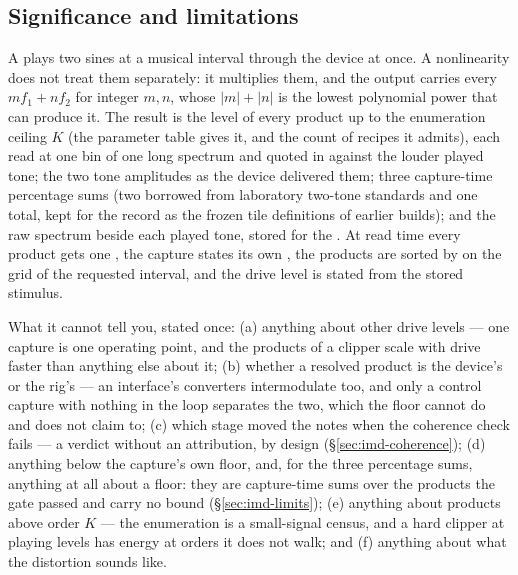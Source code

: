 \documentclass[11pt,a4paper]{article}
\begin{document}
\subsection{Significance and limitations}
A  plays two sines at a musical interval through the device
at once. A nonlinearity does not treat them separately: it multiplies them,
and the output carries every 
$m f_1 + n f_2$ for integer $m, n$, whose  $|m| + |n|$
is the lowest polynomial power that can produce it. The result is the level
of every product up to the enumeration ceiling $K$ (the parameter table
gives it, and the count of recipes it admits), each read at one bin of one
long spectrum and quoted in  against the louder played tone; the
two tone amplitudes as the device delivered them; three capture-time
percentage sums (two borrowed from laboratory two-tone standards and one
total, kept for the record as the frozen tile definitions of earlier
builds); and the raw spectrum beside each played tone, stored for the
. At read time every product gets one
, the capture states its own ,
the products are sorted by  on the grid of the
requested interval, and the drive level is stated from the stored
stimulus.

What it cannot tell you, stated once: (a) anything about other drive
levels --- one capture is one operating point, and the products of a
clipper scale with drive faster than anything else about it; (b) whether
a resolved product is the device's or the rig's --- an interface's
converters intermodulate too, and only a control capture with nothing in
the loop separates the two, which the floor cannot do and does not claim
to; (c) which stage moved the notes when the coherence check fails --- a
verdict without an attribution, by design (\S\ref{sec:imd-coherence});
(d) anything below the capture's own floor, and, for the three percentage
sums, anything at all about a floor: they are capture-time sums over the
products the gate passed and carry no bound (\S\ref{sec:imd-limits});
(e) anything about products above order $K$ --- the enumeration is a
small-signal census, and a hard clipper at playing levels has energy at
orders it does not walk; and (f) anything about what the
distortion sounds like.
\end{document}
